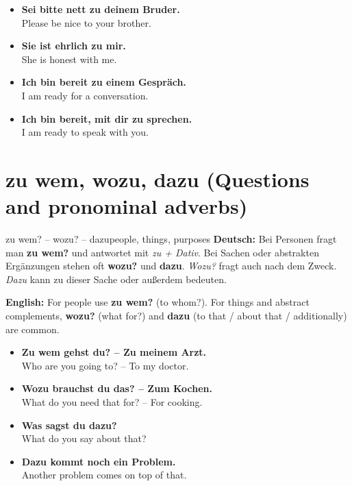 \documentclass[a4paper,11pt]{article}
\newcommand{\GermanText}[1]{\textbf{Deutsch: }#1\par}
\newcommand{\EnglishText}[1]{{\small\color{SoftGray}\textbf{English: }#1\par}}
\newcommand{\ExampleItem}[2]{\item \textbf{#1}\\{\small\color{SoftGray}#2}}
\begin{document}
\begin{exbox}
\begin{itemize}
\ExampleItem{Sei bitte nett zu deinem Bruder.}{Please be nice to your brother.}
\ExampleItem{Sie ist ehrlich zu mir.}{She is honest with me.}
\ExampleItem{Ich bin bereit zu einem Gespräch.}{I am ready for a conversation.}
\ExampleItem{Ich bin bereit, mit dir zu sprechen.}{I am ready to speak with you.}
\end{itemize}
\end{exbox}

\section{zu wem, wozu, dazu (Questions and pronominal adverbs)}
\begin{grammarentry}{zu wem? -- wozu? -- dazu}{people, things, purposes}
\GermanText{Bei Personen fragt man \textbf{zu wem?} und antwortet mit \emph{zu + Dativ}. Bei Sachen oder abstrakten Ergänzungen stehen oft \textbf{wozu?} und \textbf{dazu}. \emph{Wozu?} fragt auch nach dem Zweck. \emph{Dazu} kann \glqq zu dieser Sache\grqq{} oder \glqq außerdem\grqq{} bedeuten.}
\EnglishText{For people use \textbf{zu wem?} (to whom?). For things and abstract complements, \textbf{wozu?} (what for?) and \textbf{dazu} (to that / about that / additionally) are common.}
\end{grammarentry}
\begin{exbox}
\begin{itemize}
\ExampleItem{Zu wem gehst du? -- Zu meinem Arzt.}{Who are you going to? -- To my doctor.}
\ExampleItem{Wozu brauchst du das? -- Zum Kochen.}{What do you need that for? -- For cooking.}
\ExampleItem{Was sagst du dazu?}{What do you say about that?}
\ExampleItem{Dazu kommt noch ein Problem.}{Another problem comes on top of that.}
\end{itemize}
\end{exbox}
\end{document}
